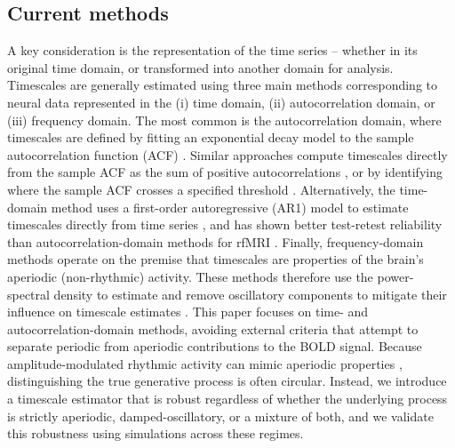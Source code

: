 \documentclass[9pt]{article}
\begin{document}
\subsection{Current methods}
A key consideration is the representation of the time series -- whether in its original time domain, or transformed into another domain for analysis. Timescales are generally estimated using three main methods corresponding to neural data represented in the (i) time domain, (ii) autocorrelation domain, or (iii) frequency domain. The most common is the autocorrelation domain, where timescales are defined by fitting an exponential decay model to the sample autocorrelation function (ACF) \citep{rossi-pool_invariant_2021, cirillo_neural_2018, ito_cortical_2020, runyan_distinct_2017, zeraati_flexible_2022, nougaret_intrinsic_2021, wasmuht_intrinsic_2018, muller_core_2020, maisson_choice-relevant_2021, li_hierarchical_2022, shafiei_topographic_2020}. Similar approaches compute timescales directly from the sample ACF as the sum of positive autocorrelations \citep{wengler_distinct_2020, manea_intrinsic_2022, watanabe_atypical_2019}, or by identifying where the sample ACF crosses a specified threshold \citep{wengler_distinct_2020, zilio_are_2021}. Alternatively, the time-domain method uses a first-order autoregressive (AR1) model to estimate timescales directly from time series \citep{kaneoke_variance_2012, meisel_decline_2017, huang_timescales_2018, lurie_cortical_2024, shinn_functional_2023, shafiei_topographic_2020, spitmaan_multiple_2020, trepka_training-dependent_2024}, and has shown better test-retest reliability than autocorrelation-domain methods for rfMRI \citep{huang_timescales_2018}. Finally, frequency-domain methods operate on the premise that timescales are properties of the brain's aperiodic (non-rhythmic) activity. These methods therefore use the power-spectral density to estimate and remove oscillatory components to mitigate their influence on timescale estimates \citep{donoghue_parameterizing_2020, gao_neuronal_2020, manea_neural_2024, zeraati_flexible_2022, fallon_timescales_2020}. This paper focuses on time- and autocorrelation-domain methods, avoiding external criteria that attempt to separate periodic from aperiodic contributions to the BOLD signal. Because amplitude-modulated rhythmic activity can mimic aperiodic properties \citep{he_temporal_2010, he_scale-free_2011}, distinguishing the true generative process is often circular. Instead, we introduce a timescale estimator that is robust regardless of whether the underlying process is strictly aperiodic, damped-oscillatory, or a mixture of both, and we validate this robustness using simulations across these regimes.
\end{document}
